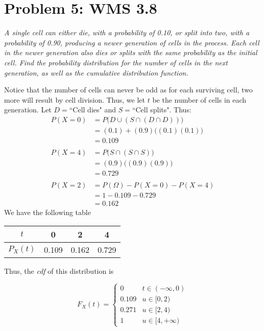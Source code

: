 \documentclass{article}
\begin{document}
	\section*{Problem 5: WMS 3.8}
	\emph{A single cell can either die, with a probability of 0.10, or split into two, with a probability of 0.90, producing a newer generation of cells in the process. Each cell in the newer generation also dies or splits with the same probability as the initial cell. Find the probability distribution for the number of cells in the next generation, as well as the cumulative distribution function.}
	\begin{sol}
		Notice that the number of cells can never be odd as for each surviving cell, two more will result by cell division.  Thus, we let $t$ be the number of cells in each generation. Let $D=$``Cell dies" and $S=$``Cell splits". Thus:
		\begin{align*}
			P(X=0) &= P\big(D\cup (S \cap (D\cap D ))\big) \\
			&= (0.1) + (0.9) \big( (0.1)(0.1) \big) \\
			&= 0.109\\
			&\\
			P(X=4) &= P \big( S \cap (S \cap S)\big)\\
			&= (0.9)\big( (0.9)(0.9) \big) \\
			&= 0.729 \\
			&\\
			P(X=2) &= P (\Omega) - P(X=0) - P(X=4) \\
			&= 1 - 0.109 - 0.729\\
			&= 0.162
		\end{align*}
		We have the following table
		\begin{table}[h]
			\begin{tabular}{|c|c|c|c|}
				\hline
				$t$	&	0	&	2	&	4 \\ \hline
				$P_X(t)$ & 0.109 & 0.162 & 0.729 \\ \hline 
			\end{tabular}
		\end{table}
		Thus, the \emph{cdf} of this distribution is
		\begin{figure}[h]
			\begin{subfigure}{0.46\textwidth}
				$$F_X (t) =  \begin{cases}
				0 & t \in (-\infty, 0) \\
				0.109 & u \in [0, 2) \\
				0. 271 & u \in [2, 4) \\
				1 & u \in [4, + \infty)

\end{cases}$$
\end{subfigure}
\end{figure}
\end{sol}
\end{document}
